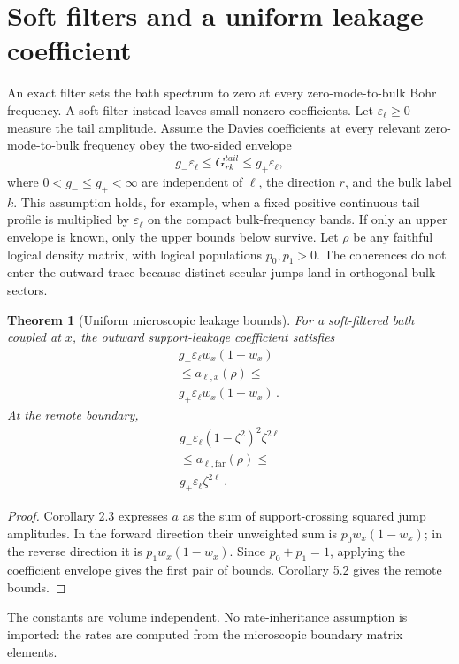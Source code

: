 \documentclass[11pt,a4paper]{article}
\newtheorem{theorem}{Theorem}[section]
\theoremstyle{remark}
\begin{document}
\section{Soft filters and a uniform leakage coefficient}
An exact filter sets the bath spectrum to zero at every zero-mode-to-bulk Bohr frequency. A soft filter instead leaves small nonzero coefficients.
Let $\varepsilon_\ell\ge 0$ measure the tail amplitude. Assume the Davies coefficients at every relevant zero-mode-to-bulk frequency obey the two-sided envelope
\[
g_- \varepsilon_\ell\le G_{rk}^{tail}\le g_+ \varepsilon_\ell\mathpunct{,}
\]
where $0<g_-\le g_+<\infty$ are independent of $\ell$, the direction $r$, and the bulk label $k$. This assumption holds, for example, when a fixed positive continuous tail profile is multiplied by $\varepsilon_\ell$ on the compact bulk-frequency bands. If only an upper envelope is known, only the upper bounds below survive.
Let $\rho$ be any faithful logical density matrix, with logical populations $p_0,p_1>0$. The coherences do not enter the outward trace because distinct secular jumps land in orthogonal bulk sectors.
\begin{theorem}[Uniform microscopic leakage bounds]
For a soft-filtered bath coupled at $x$, the outward support-leakage coefficient satisfies
\[
\begin{gathered}
g_- \varepsilon_\ell w_x(1-w_x) \\
\le a_{\ell,x}(\rho)\le  \\
g_+ \varepsilon_\ell w_x(1-w_x)\mathpunct{.}
\end{gathered}
\]
At the remote boundary,
\[
\begin{gathered}
g_- \varepsilon_\ell(1-\zeta^{2})^{2} \zeta^{2\ell} \\
\le a_{\ell,\mathrm{far}}(\rho)\le  \\
g_+ \varepsilon_\ell \zeta^{2\ell}\mathpunct{.}
\end{gathered}
\]
\end{theorem}
\begin{proof}
Corollary 2.3 expresses $a$ as the sum of support-crossing squared jump amplitudes. In the forward direction their unweighted sum is $p_0 w_x(1-w_x)$; in the reverse direction it is $p_1 w_x(1-w_x)$. Since $p_0+p_1=1$, applying the coefficient envelope gives the first pair of bounds. Corollary 5.2 gives the remote bounds.
\end{proof}
The constants are volume independent. No rate-inheritance assumption is imported: the rates are computed from the microscopic boundary matrix elements.
\end{document}
